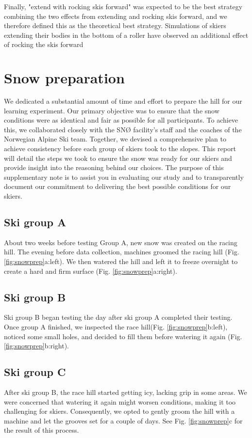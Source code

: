 \documentclass[pdflatex,sn-nature]{sn-jnl}%
\theoremstyle{thmstyleone}%
\theoremstyle{thmstyletwo}%
\theoremstyle{thmstylethree}%
\begin{document}
\begin{appendices}
Finally, "extend with rocking skis forward" was expected to be the best strategy combining the two effects from extending and rocking skis forward, and we therefore defined this as the theoretical best strategy. Simulations of skiers extending their bodies in the bottom of a roller have observed an additional effect of rocking the skis forward \cite{mote_accelerations_1983}


\section{Snow preparation}\label{sup_snowprep}
We dedicated a substantial amount of time and effort to prepare the hill for our learning experiment. Our primary objective was to ensure that the snow conditions were as identical and fair as possible for all participants. To achieve this, we collaborated closely with the SNØ facility’s staff and the coaches of the Norwegian Alpine Ski team. Together, we devised a comprehensive plan to achieve consistency before each group of skiers took to the slopes. This report will detail the steps we took to ensure the snow was ready for our skiers and provide insight into the reasoning behind our choices. The purpose of this supplementary note is to assist you in evaluating our study and to transparently document our commitment to delivering the best possible conditions for our skiers.

\subsection*{Ski group A}
About two weeks before testing Group A, new snow was created on the racing hill. The evening before data collection, machines groomed the racing hill (Fig. \ref{fig:snowprep}a:left). We then watered the hill and left it to freeze overnight to create a hard and firm surface (Fig. \ref{fig:snowprep}a:right). 

\subsection*{Ski group B}
Ski group B began testing the day after ski group A completed their testing. Once group A finished, we inspected the race hill(Fig. \ref{fig:snowprep}b:left), noticed some small holes, and decided to fill them before watering it again (Fig. \ref{fig:snowprep}b:right).  

\subsection*{Ski group C}
After ski group B, the race hill started getting icy, lacking grip in some areas. We were concerned that watering it again might worsen conditions, making it too challenging for skiers. Consequently, we opted to gently groom the hill with a machine and let the grooves set for a couple of days. See Fig. \ref{fig:snowprep}c for the result of this process.


\end{appendices}
\end{document}
